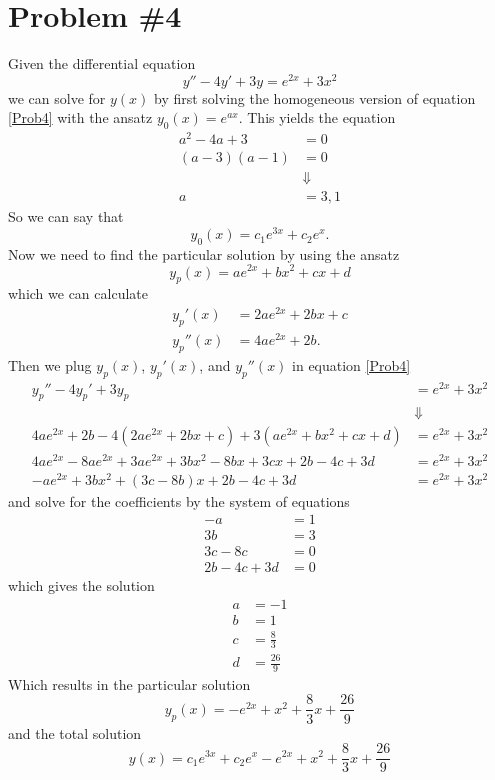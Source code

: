 \documentclass[11pt]{article}
\numberwithin{equation}{section}
\begin{document}
\section{Problem \#4}
Given the differential equation
\begin{equation}
y'' - 4y' + 3y = e^{2x}+3x^2
\label{Prob4}
\end{equation}
we can solve for $y(x)$ by first solving the homogeneous version of equation \ref{Prob4} 
with the ansatz $y_0(x) = e^{ax}$. This yields the equation
\begin{align*}
a^2 - 4a + 3 &= 0\\
(a-3)(a-1) &= 0\\
&\Downarrow\\
a &= 3,1
\end{align*}
So we can say that 
$$y_0(x) = c_1e^{3x} + c_2e^{x}.$$
Now we need to find the particular solution by using the ansatz 
$$y_p(x) = ae^{2x} + bx^2 + cx + d$$
which we can calculate
\begin{align*}
y_p'(x) &= 2ae^{2x} + 2bx + c\\
y_p''(x) &= 4ae^{2x} + 2b.
\end{align*}
Then we plug $y_p(x)$, $y_p'(x)$, and $y_p''(x)$ in equation \ref{Prob4} 
\begin{align*}
y_p'' - 4y_p' + 3y_p &= e^{2x}+3x^2\\
&\Downarrow\\
4ae^{2x} + 2b - 4(2ae^{2x} + 2bx + c) + 3(ae^{2x} + bx^2 + cx + d) &= e^{2x}+3x^2\\
4ae^{2x}-8ae^{2x}+3ae^{2x} + 3bx^2 - 8bx+3cx + 2b-4c+3d &= e^{2x}+3x^2\\
-ae^{2x} + 3bx^2 + (3c-8b)x + 2b-4c+3d &= e^{2x}+3x^2
\end{align*}
and solve for the coefficients by the system of equations
\begin{align*}
-a &= 1\\
3b &= 3\\
3c - 8c &= 0\\
2b - 4c +3d &= 0
\end{align*}
which gives the solution
\begin{align*}
a &= -1\\
b &= 1\\
c &= \frac{8}{3}\\
d &= \frac{26}{9}
\end{align*}
Which results in the particular solution
$$y_p(x) = -e^{2x} + x^2 + \frac{8}{3}x + \frac{26}{9}$$ 
and the total solution
$$y(x) =c_1e^{3x} + c_2e^{x} -e^{2x} + x^2 + \frac{8}{3}x + \frac{26}{9}$$ 
\end{document}
